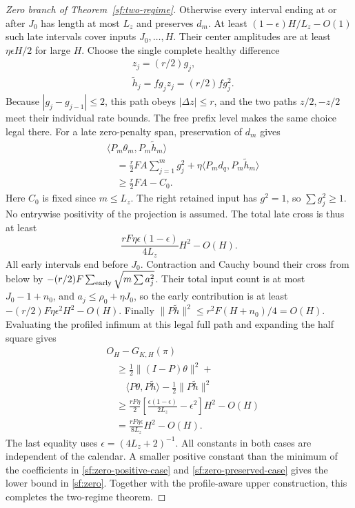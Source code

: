 \documentclass[journal]{IEEEtran}
\begin{document}
\begin{proof}[Zero branch of Theorem~\ref{sf:two-regime}]
Otherwise every interval ending at or after $J_0$ has length
at most $L_z$ and preserves $d_m$.
At least $(1-\epsilon)H/L_z-O(1)$ such late intervals cover
inputs $J_0,\ldots,H$. Their center amplitudes are at least
$\eta\epsilon H/2$ for large $H$.
Choose the single complete healthy difference
\[
\begin{aligned}
&z_j=(r/2)g_j,\\
&\widetilde h_j=fg_jz_j=(r/2)fg_j^2 .
\end{aligned}
\]
Because $|g_j-g_{j-1}|\le2$, this path obeys $|\Delta z|\le r$,
and the two paths $z/2,-z/2$ meet their individual rate bounds.
The free prefix level makes the same choice legal there.
For a late zero-penalty span, preservation of $d_m$ gives
\[
\begin{aligned}
&\langle P_m\theta_m,P_m\widetilde h_m\rangle\\
&\quad=\frac r2FA\sum_{j=1}^m g_j^2+\eta\langle P_md_q,P_m\widetilde h_m\rangle\\
&\quad\ge \frac r2FA-C_0 .
\end{aligned}
\]
Here $C_0$ is fixed since $m\le L_z$.
The right retained input has $g^2=1$, so $\sum g_j^2\ge1$.
No entrywise positivity of the projection is assumed.
The total late cross is thus at least
\[
\frac{rF\eta\epsilon(1-\epsilon)}{4L_z}H^2-O(H).
\]
All early intervals end before $J_0$.
Contraction and Cauchy bound their cross from below by
$-(r/2)F\sum_{\rm early}\sqrt{m\sum a_j^2}$.
Their total input count is at most $J_0-1+n_0$, and
$a_j\le\rho_0+\eta J_0$, so the early contribution is at least
$-(r/2)F\eta\epsilon^2H^2-O(H)$.
Finally $\|P\widetilde h\|^2\le r^2F(H+n_0)/4=O(H)$.
Evaluating the profiled infimum at this legal full path and expanding
the half square gives
\begin{equation}\label{sf:zero-preserved-case}
\begin{aligned}
&O_H-G_{K,H}(\pi)\\
&\quad\ge \tfrac12\|(I-P)\theta\|^2+\\
&\qquad \langle P\theta,P\widetilde h\rangle-\tfrac12\|P\widetilde h\|^2\\
&\quad\ge \frac{rF\eta}{2}\left[\frac{\epsilon(1-\epsilon)}{2L_z}-\epsilon^2\right]H^2-O(H)\\
&\quad=\frac{rF\eta\epsilon}{8L_z}H^2-O(H).
\end{aligned}
\end{equation}
The last equality uses $\epsilon=(4L_z+2)^{-1}$.
All constants in both cases are independent of the calendar.
A smaller positive constant than the minimum of the coefficients
in \eqref{sf:zero-positive-case} and \eqref{sf:zero-preserved-case}
gives the lower bound in \eqref{sf:zero}.
Together with the profile-aware upper construction, this completes
the two-regime theorem.
\end{proof}
\end{document}
